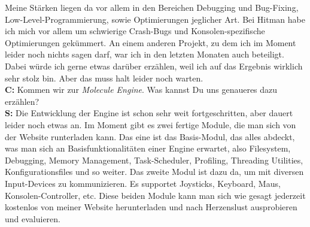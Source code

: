 \documentclass[10pt,a4paper,ngerman,twoside]{article} %
\begin{document}
Meine Stärken liegen da vor allem in den Bereichen Debugging und Bug-Fixing, Low-Level-Programmierung, sowie Optimierungen jeglicher Art. Bei Hitman habe ich mich vor allem um schwierige Crash-Bugs und Konsolen-spezifische Optimierungen gekümmert. An einem anderen Projekt, zu dem ich im Moment leider noch nichts sagen darf, war ich in den letzten Monaten auch beteiligt. Dabei würde ich gerne etwas darüber erzählen, weil ich auf das Ergebnis wirklich sehr stolz bin. Aber das muss halt leider noch warten. \\
\textbf{C:} Kommen wir zur \textit{Molecule Engine}. Was kannst Du uns genaueres dazu erzählen? \\
\textbf{S:} Die Entwicklung der Engine ist schon sehr weit fortgeschritten, aber dauert leider noch etwas an. Im  Moment gibt es zwei fertige Module, die man sich von der Website runterladen kann. Das eine ist das Basis-Modul, das alles abdeckt, was man sich an Basisfunktionalitäten einer Engine erwartet, also Filesystem, Debugging, Memory Management, Task-Scheduler, Profiling, Threading Utilities, Konfigurationsfiles und so weiter. Das zweite Modul ist dazu da, um mit diversen Input-Devices zu kommunizieren. Es supportet Joysticks, Keyboard, Maus, Konsolen-Controller, etc. Diese beiden Module kann man sich wie gesagt jederzeit kostenlos von meiner Website herunterladen und nach Herzenslust ausprobieren und evaluieren.
\end{document}
